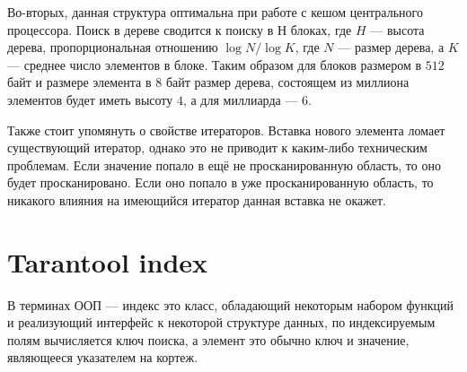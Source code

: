 Во-вторых, данная структура оптимальна при работе с кешом центрального процессора.
Поиск в дереве сводится к поиску в $Н$ блоках,
где $H$ --- высота дерева,
пропорциональная отношению $\log{N}/\log{K}$,
где $N$ --- размер дерева, а $K$ --- среднее число элементов в блоке.
Таким образом для блоков размером в $512$ байт и размере элемента в $8$ байт размер дерева,
состоящем из миллиона элементов будет иметь высоту $4$,
а для миллиарда --- $6$.

Также стоит упомянуть о свойстве итераторов.
Вставка нового элемента ломает существующий итератор,
однако это не приводит к каким-либо техническим проблемам.
Если значение попало в ещё не просканированную область,
то оно будет просканировано.
Если оно попало в уже просканированную область,
то никакого влияния на имеющийся итератор данная вставка не окажет.

\section{Tarantool index}
В терминах ООП --- индекс это класс,
обладающий некоторым набором функций и реализующий интерфейс
к некоторой структуре данных,
по индексируемым полям вычисляется ключ поиска,
а элемент это обычно ключ и значение, являющееся указателем на кортеж.

